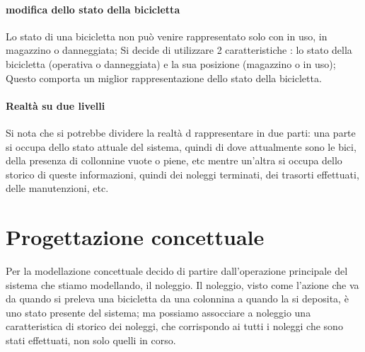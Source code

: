 \documentclass[a4paper,twoside]{article}
\begin{document}
\paragraph{modifica dello stato della bicicletta} Lo stato di una bicicletta non può venire rappresentato solo con in uso, in magazzino o danneggiata; Si decide di utilizzare 2 caratteristiche : lo stato della bicicletta (operativa o danneggiata) e la sua posizione (magazzino o in uso); Questo comporta un miglior rappresentazione dello stato della bicicletta.
\paragraph{Realtà su due livelli} Si nota che si potrebbe dividere la realtà d rappresentare in due parti: una parte si occupa dello stato attuale del sistema, quindi di dove attualmente sono le bici, della presenza di collonnine vuote o piene, etc mentre un'altra si occupa dello storico di queste informazioni, quindi dei noleggi terminati, dei trasorti effettuati, delle manutenzioni, etc.

\section{Progettazione concettuale}
Per la modellazione concettuale decido di partire dall'operazione principale del sistema che stiamo modellando, il noleggio.
Il noleggio, visto come l'azione che va da quando si preleva una bicicletta da una colonnina a quando la si deposita, è uno stato presente del sistema; ma possiamo assocciare a noleggio una caratteristica di storico dei noleggi, che corrispondo ai tutti i noleggi che sono stati effettuati, non solo quelli in corso.
\end{document}
